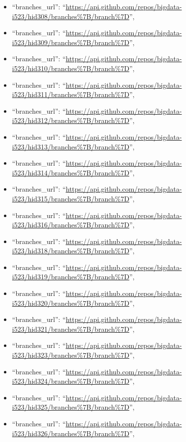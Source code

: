 \begin{itemize}
\item
  ``branches\_url'':
  ``\url{https://api.github.com/repos/bigdata-i523/hid308/branches\%7B/branch\%7D}'',
\item
  ``branches\_url'':
  ``\url{https://api.github.com/repos/bigdata-i523/hid309/branches\%7B/branch\%7D}'',
\item
  ``branches\_url'':
  ``\url{https://api.github.com/repos/bigdata-i523/hid310/branches\%7B/branch\%7D}'',
\item
  ``branches\_url'':
  ``\url{https://api.github.com/repos/bigdata-i523/hid311/branches\%7B/branch\%7D}'',
\item
  ``branches\_url'':
  ``\url{https://api.github.com/repos/bigdata-i523/hid312/branches\%7B/branch\%7D}'',
\item
  ``branches\_url'':
  ``\url{https://api.github.com/repos/bigdata-i523/hid313/branches\%7B/branch\%7D}'',
\item
  ``branches\_url'':
  ``\url{https://api.github.com/repos/bigdata-i523/hid314/branches\%7B/branch\%7D}'',
\item
  ``branches\_url'':
  ``\url{https://api.github.com/repos/bigdata-i523/hid315/branches\%7B/branch\%7D}'',
\item
  ``branches\_url'':
  ``\url{https://api.github.com/repos/bigdata-i523/hid316/branches\%7B/branch\%7D}'',
\item
  ``branches\_url'':
  ``\url{https://api.github.com/repos/bigdata-i523/hid318/branches\%7B/branch\%7D}'',
\item
  ``branches\_url'':
  ``\url{https://api.github.com/repos/bigdata-i523/hid319/branches\%7B/branch\%7D}'',
\item
  ``branches\_url'':
  ``\url{https://api.github.com/repos/bigdata-i523/hid320/branches\%7B/branch\%7D}'',
\item
  ``branches\_url'':
  ``\url{https://api.github.com/repos/bigdata-i523/hid321/branches\%7B/branch\%7D}'',
\item
  ``branches\_url'':
  ``\url{https://api.github.com/repos/bigdata-i523/hid323/branches\%7B/branch\%7D}'',
\item
  ``branches\_url'':
  ``\url{https://api.github.com/repos/bigdata-i523/hid324/branches\%7B/branch\%7D}'',
\item
  ``branches\_url'':
  ``\url{https://api.github.com/repos/bigdata-i523/hid325/branches\%7B/branch\%7D}'',
\item
  ``branches\_url'':
  ``\url{https://api.github.com/repos/bigdata-i523/hid326/branches\%7B/branch\%7D}'',

\end{itemize}

